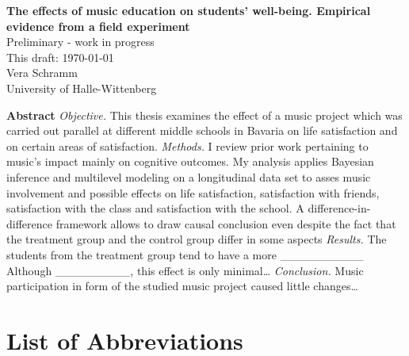 \documentclass[a4, 12pt]{article}
\begin{document}
\begin{titlepage}
\thispagestyle{empty}%
\begin{center}
\renewcommand{\baselinestretch}{1.0}\normalsize %
\textbf{
The effects of music education on students' well-being. Empirical evidence from a field experiment}\\[1cm]
Preliminary - work in progress \\[1cm]
This draft: \today \\[1cm]
Vera Schramm \\
University of Halle-Wittenberg \\[0.75cm]
 \end{center}


\end{titlepage}

\setcounter{page}{2}

\renewcommand{\baselinestretch}{1}\normalsize

\textbf{\normalsize Abstract}
\emph{Objective.} This thesis examines the effect of a music project which was carried out parallel at different middle schools in Bavaria on life satisfaction and on certain areas of satisfaction. \emph{Methods.} I review prior work pertaining to music's impact mainly on cognitive outcomes. My analysis applies Bayesian inference and multilevel modeling on a longitudinal data set to asses music involvement and possible effects on life satisfaction, satisfaction with friends, satisfaction with the class and satisfaction with the school. A difference-in-difference framework allows to draw causal conclusion even despite the fact that the treatment group and the control group differ in some aspects \emph{Results.} The students from the treatment group tend to have a more \_\_\_\_\_\_\_\_\_\_ Although \_\_\_\_\_\_\_\_\_, this effect is only minimal\ldots{} \emph{Conclusion.} Music participation in form of the studied music project caused little changes\ldots{}

\clearpage
\tableofcontents

\clearpage

\hypertarget{list-of-abbreviations}{%
\section*{List of Abbreviations}\label{list-of-abbreviations}}
\end{document}
